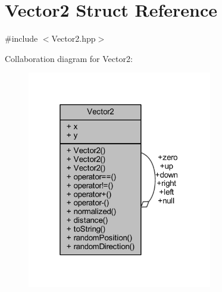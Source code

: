\hypertarget{struct_vector2}{}\section{Vector2 Struct Reference}
\label{struct_vector2}


{\ttfamily \#include $<$Vector2.\+hpp$>$}



Collaboration diagram for Vector2\+:
\nopagebreak
\begin{figure}[H]
\begin{center}
\leavevmode
\includegraphics[width=229pt]{struct_vector2__coll__graph}
\end{center}
\end{figure}
